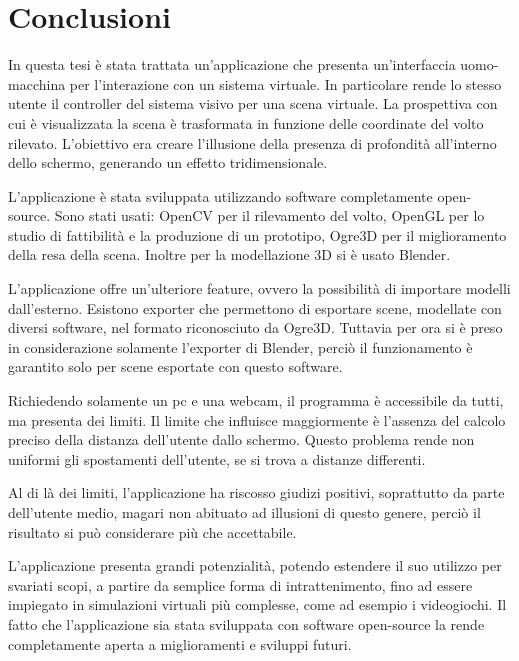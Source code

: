 
\chapter*{Conclusioni}
In questa tesi è stata trattata un'applicazione che presenta un'interfaccia uomo-macchina per l'interazione con un sistema virtuale. In particolare rende lo stesso utente il controller del sistema visivo per una scena virtuale. La prospettiva con cui è visualizzata la scena è trasformata in funzione delle coordinate del volto rilevato. L'obiettivo era creare l'illusione della presenza di profondità all'interno dello schermo, generando un effetto tridimensionale.

L'applicazione è stata sviluppata utilizzando software completamente open-source. Sono stati usati:
OpenCV per il rilevamento del volto, OpenGL per lo studio di fattibilità e la produzione di un prototipo, Ogre3D per il miglioramento della resa della scena. Inoltre per la modellazione 3D si è usato Blender.

L'applicazione offre un'ulteriore feature, ovvero la possibilità di importare modelli dall'esterno. Esistono exporter che permettono di esportare scene, modellate con diversi software, nel formato riconosciuto da Ogre3D. Tuttavia per ora si è preso in considerazione solamente l'exporter di Blender, perciò il funzionamento è garantito solo per scene esportate con questo software.

Richiedendo solamente un pc e una webcam, il programma è accessibile da tutti, ma presenta dei limiti. Il limite che influisce maggiormente è l'assenza del calcolo preciso della distanza dell'utente dallo schermo. Questo problema rende non uniformi gli spostamenti dell'utente, se si trova a distanze differenti.

Al di là dei limiti, l'applicazione ha riscosso giudizi positivi, soprattutto da parte dell'utente medio, magari non abituato ad illusioni di questo genere, perciò il risultato si può considerare più che accettabile.

L'applicazione presenta grandi potenzialità, potendo estendere il suo utilizzo per svariati scopi, a partire da semplice forma di intrattenimento, fino ad essere impiegato in simulazioni virtuali più complesse, come ad esempio i videogiochi. Il fatto che l'applicazione sia stata sviluppata con software open-source la rende completamente aperta a miglioramenti e sviluppi futuri. 

